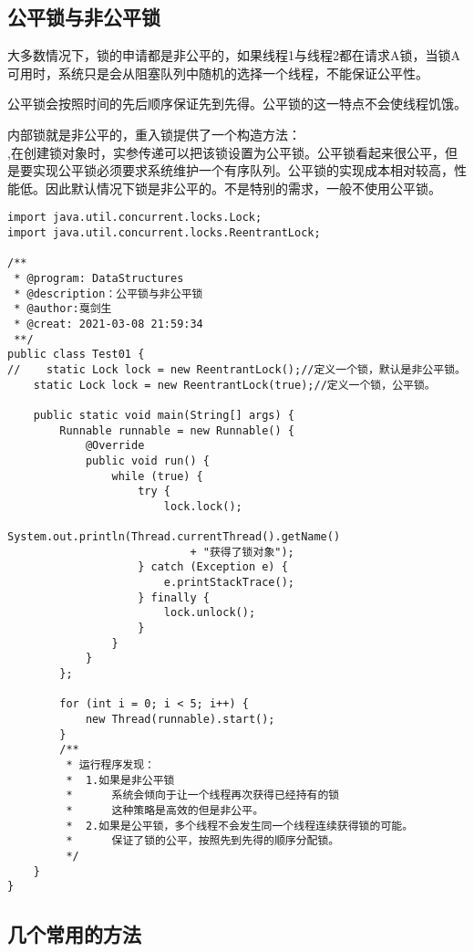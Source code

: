 \documentclass[a4paper]{report}
\begin{document}
\subsection{公平锁与非公平锁}
大多数情况下，锁的申请都是非公平的，如果线程1与线程2都在请求A锁，当锁A可用时，系统只是会从阻塞队列中随机的选择一个线程，不能保证公平性。

公平锁会按照时间的先后顺序保证先到先得。公平锁的这一特点不会使线程饥饿。

内部锁就是非公平的，重入锁提供了一个构造方法：\\ ,在创建锁对象时，实参传递可以把该锁设置为公平锁。公平锁看起来很公平，但是要实现公平锁必须要求系统维护一个有序队列。公平锁的实现成本相对较高，性能低。因此默认情况下锁是非公平的。不是特别的需求，一般不使用公平锁。


\begin{Verbatim}[frame=single,numbersep=5pt,xleftmargin=1.5em,xrightmargin=1.5em]
import java.util.concurrent.locks.Lock;
import java.util.concurrent.locks.ReentrantLock;

/**
 * @program: DataStructures
 * @description：公平锁与非公平锁
 * @author:戛剑生
 * @creat: 2021-03-08 21:59:34
 **/
public class Test01 {
//    static Lock lock = new ReentrantLock();//定义一个锁，默认是非公平锁。
    static Lock lock = new ReentrantLock(true);//定义一个锁，公平锁。

    public static void main(String[] args) {
        Runnable runnable = new Runnable() {
            @Override
            public void run() {
                while (true) {
                    try {
                        lock.lock();
                        System.out.println(Thread.currentThread().getName()
                            + "获得了锁对象");
                    } catch (Exception e) {
                        e.printStackTrace();
                    } finally {
                        lock.unlock();
                    }
                }
            }
        };

        for (int i = 0; i < 5; i++) {
            new Thread(runnable).start();
        }
        /**
         * 运行程序发现：
         *  1.如果是非公平锁
         *      系统会倾向于让一个线程再次获得已经持有的锁
         *      这种策略是高效的但是非公平。
         *  2.如果是公平锁，多个线程不会发生同一个线程连续获得锁的可能。
         *      保证了锁的公平，按照先到先得的顺序分配锁。
         */
    }
}\end{Verbatim}
\subsection{几个常用的方法}
\end{document}
